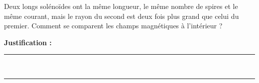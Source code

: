 Deux longs solénoïdes ont la même longueur, le même nombre de spires et le même courant, mais le rayon du second est deux fois plus grand que celui du premier. Comment se comparent les champs magnétiques à l'intérieur ?

\choices

\noindent\textbf{Justification :} \hrulefill \\[2.5ex]
\rule{\linewidth}{0.4pt} \\[2.5ex]
\rule{\linewidth}{0.4pt}
\vfill

